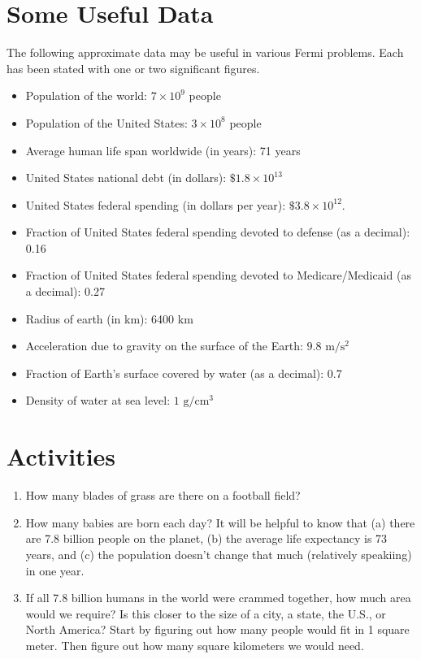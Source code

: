 \documentclass[
]{book}
\providecommand{\tightlist}{%
  \setlength{\itemsep}{0pt}\setlength{\parskip}{0pt}}
\begin{document}
\hypertarget{some-useful-data}{%
\section{Some Useful Data}\label{some-useful-data}}

The following approximate data may be useful in various Fermi problems. Each has been stated with one or two significant figures.

\begin{itemize}
\tightlist
\item
  Population of the world: \(7 \times 10^9\) people
\item
  Population of the United States: \(3 \times 10^8\) people
\item
  Average human life span worldwide (in years): 71 years\\
\item
  United States national debt (in dollars): \(\$1.8 \times 10^{13}\)
\item
  United States federal spending (in dollars per year): \(\$3.8 \times 10^{12}\).
\item
  Fraction of United States federal spending devoted to defense (as a decimal): 0.16
\item
  Fraction of United States federal spending devoted to Medicare/Medicaid (as a decimal): 0.27
\item
  Radius of earth (in km): 6400 km
\item
  Acceleration due to gravity on the surface of the Earth: \(9.8 \text{ m/}\text{s}^2\)
\item
  Fraction of Earth's surface covered by water (as a decimal): 0.7
\item
  Density of water at sea level: \(1 \text{ g}/\text{cm}^3\)
\end{itemize}

\hypertarget{activities-9}{%
\section{Activities}\label{activities-9}}

\begin{enumerate}
\def\labelenumi{\arabic{enumi}.}
\item
  How many blades of grass are there on a football field?
\item
  How many babies are born each day? It will be helpful to know that (a) there are 7.8 billion people on the planet, (b) the average life expectancy is 73 years, and (c) the population doesn't change that much (relatively speakiing) in one year.
\item
  If all 7.8 billion humans in the world were crammed together, how much area would we require? Is this closer to the size of a city, a state, the U.S., or North America? Start by figuring out how many people would fit in 1 square meter. Then figure out how many square kilometers we would need.
\end{enumerate}
\end{document}
